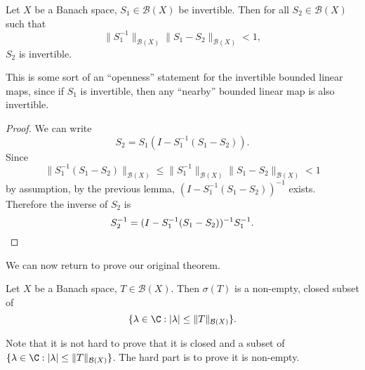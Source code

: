 \documentclass[a4paper]{article}
\begin{document}
\begin{lemma}
  Let $X$ be a Banach space, $S_1 \in \mathcal{B}(X)$ be invertible. Then for all $S_2 \in \mathcal{B}(X)$ such that
  \[
    \|S_1^{-1}\|_{\mathcal{B}(X)} \|S_1 - S_2\|_{\mathcal{B}(X)} < 1,
  \]
  $S_2$ is invertible.
\end{lemma}
This is some sort of an ``openness'' statement for the invertible bounded linear maps, since if $S_1$ is invertible, then any ``nearby'' bounded linear map is also invertible.
\begin{proof}
  We can write
  \[
    S_2 = S_1(I - S_1^{-1}(S_1 - S_2)).
  \]
  Since
  \[
    \|S_1^{-1}(S_1 - S_2)\|_{\mathcal{B}(X)} \leq \|S_1^{-1} \|_{\mathcal{B}(X)} \|S_1 - S_2\|_{\mathcal{B}(X)} < 1
  \]
  by assumption, by the previous lemma, $(I - S_1^{-1}(S_1 - S_2))^{-1}$ exists. Therefore the inverse of $S_2$ is
  \[
    S_2^{-1} = (I - S_1^{-1}(S_1 - S_2))^{-1} S_1^{-1}.\qedhere
  \]
\end{proof}

We can now return to prove our original theorem.
\begin{thm}
  Let $X$ be a Banach space, $T \in \mathcal{B}(X)$. Then $\sigma(T)$ is a non-empty, closed subset of
  \[
    \{\lambda \in \C: |\lambda| \leq \|T\|_{\mathcal{B}(X)}\}.
  \]
\end{thm}
Note that it is not hard to prove that it is closed and a subset of $\{\lambda \in \C: |\lambda| \leq \|T\|_{\mathcal{B}(X)}\}$. The hard part is to prove it is non-empty.
\end{document}
